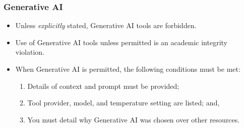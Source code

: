 \begin{frame}
  \frametitle{Generative AI}

  \begin{itemize}
  \item[\(\rightarrow\)] Unless \emph{explicitly} stated, Generative AI tools are forbidden.
  \item[\(\rightarrow\)] Use of Generative AI tools unless permitted is an academic integrity violation.
    \vspace{1em}
  \item When Generative AI is permitted, the following conditions must be met:
    \begin{enumerate}
    \item Details of context and prompt must be provided;
    \item Tool provider, model, and temperature setting are listed; and,
    \item You must detail why Generative AI was chosen over other resources.
    \end{enumerate}
  \end{itemize}
  
\end{frame}
